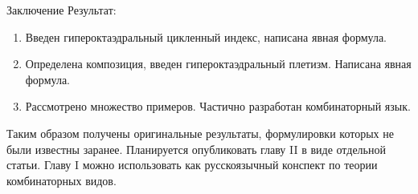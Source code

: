 \documentclass{beamer}
\begin{document}
\begin{frame}{Заключение}
Результат:
\begin{enumerate}[*]
\item Введен гипероктаэдральный цикленный индекс, написана явная формула.
\item Определена композиция, введен гипероктаэдральный плетизм. Написана явная
формула.
\item Рассмотрено множество примеров. Частично разработан комбинаторный язык.
\end{enumerate}

Таким образом получены оригинальные результаты, формулировки которых
не были известны заранее. Планируется опубликовать главу II в виде отдельной
статьи. Главу I можно использовать как русскоязычный конспект по теории
комбинаторных видов.

\end{frame}
\end{document}
